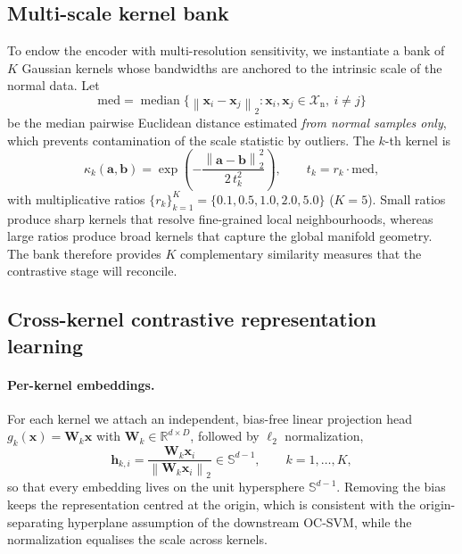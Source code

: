 \documentclass[preprint,12pt]{elsarticle}
\newcommand{\R}{\mathbb{R}}
\newcommand{\Sph}{\mathbb{S}}
\newcommand{\norm}[1]{\left\lVert #1 \right\rVert}
\newcommand{\Xnorm}{\mathcal{X}_{\mathrm{n}}}
\newcommand{\hh}{\bm{h}}
\newcommand{\xx}{\bm{x}}
\newcommand{\WW}{\bm{W}}
\begin{document}
\subsection{Multi-scale kernel bank}
\label{subsec:kernels}

To endow the encoder with multi-resolution sensitivity, we instantiate a bank
of $K$ Gaussian kernels whose bandwidths are anchored to the intrinsic scale of
the normal data. Let
\begin{equation}
\mathrm{med}
=\operatorname{median}\!\big\{\norm{\xx_i-\xx_j}_2 :
\xx_i,\xx_j\in\Xnorm,\ i\neq j\big\}
\label{eq:median}
\end{equation}
be the median pairwise Euclidean distance estimated \emph{from normal samples
only}, which prevents contamination of the scale statistic by outliers. The
$k$-th kernel is
\begin{equation}
\kappa_k(\bm{a},\bm{b})
=\exp\!\left(-\frac{\norm{\bm{a}-\bm{b}}_2^{2}}{2\,t_k^{2}}\right),
\qquad
t_k = r_k\cdot\mathrm{med},
\label{eq:gaussian}
\end{equation}
with multiplicative ratios $\{r_k\}_{k=1}^{K}=\{0.1,0.5,1.0,2.0,5.0\}$
($K=5$). Small ratios produce sharp kernels that resolve fine-grained local
neighbourhoods, whereas large ratios produce broad kernels that capture the
global manifold geometry. The bank therefore provides $K$ complementary
similarity measures that the contrastive stage will reconcile.

\subsection{Cross-kernel contrastive representation learning}
\label{subsec:contrastive}

\paragraph{Per-kernel embeddings.}
For each kernel we attach an independent, bias-free linear projection head
$g_k(\xx)=\WW_k\xx$ with $\WW_k\in\R^{d\times D}$, followed by
$\ell_2$ normalization,
\begin{equation}
\hh_{k,i}
=\frac{\WW_k\xx_i}{\norm{\WW_k\xx_i}_2}\in\Sph^{d-1},
\qquad k=1,\dots,K,
\label{eq:embedding}
\end{equation}
so that every embedding lives on the unit hypersphere $\Sph^{d-1}$. Removing the
bias keeps the representation centred at the origin, which is consistent with
the origin-separating hyperplane assumption of the downstream OC-SVM, while the
normalization equalises the scale across kernels.
\end{document}
